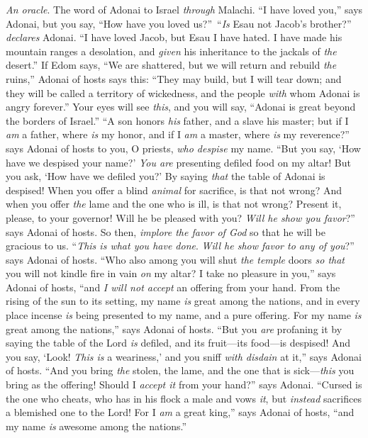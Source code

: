 
\begin{biblechapter} %
\verse \textit{An oracle}. The word of Adonai to Israel \textit{through} Malachi.
 “I have loved you,” says Adonai, but you say, “How have you loved us?” “\textit{Is} Esau not Jacob’s brother?” \textit{declares} Adonai. “I have loved Jacob,
\verse but Esau I have hated. I have made his mountain ranges a desolation, and \textit{given} his inheritance to the jackals of \textit{the} desert.”
\verse If Edom says, “We are shattered, but we will return and rebuild \textit{the} ruins,” Adonai of hosts says this: “They may build, but I will tear down; and they will be called a territory of wickedness, and the people \textit{with} whom Adonai is angry forever.”
\verse Your eyes will see \textit{this}, and you will say, “Adonai is great beyond the borders of Israel.”
 “A son honors \textit{his} father, and a slave his master; but if I \textit{am} a father, where \textit{is} my honor, and if I \textit{am} a master, where \textit{is} my reverence?” says Adonai of hosts to you, O priests, \textit{who despise} my name. “But you say, ‘How have we despised your name?’
\verse \textit{You are} presenting defiled food on my altar! But you ask, ‘How have we defiled you?’ By saying \textit{that} the table of Adonai is despised!
\verse When you offer a blind \textit{animal} for sacrifice, is that not wrong? And when you offer \textit{the} lame and the one who is ill, is that not wrong? Present it, please, to your governor! Will he be pleased with you? \textit{Will he show you favor}?” says Adonai of hosts.
\verse So then, \textit{implore the favor of God} so that he will be gracious to us. “\textit{This is what you have done}. \textit{Will he show favor to any of you}?” says Adonai of hosts.
\verse “Who also among you will shut \textit{the temple} doors \textit{so that} you will not kindle fire in vain \textit{on} my altar? I take no pleasure in you,” says Adonai of hosts, “and \textit{I will not accept} an offering from your hand.
\verse From the rising of the sun to its setting, my name \textit{is} great among the nations, and in every place incense \textit{is} being presented to my name, and a pure offering. For my name \textit{is} great among the nations,” says Adonai of hosts.
\verse “But you \textit{are} profaning it by saying the table of the Lord \textit{is} defiled, and its fruit—its food—is despised!
\verse And you say, ‘Look! \textit{This is} a weariness,’ and you sniff \textit{with disdain} at it,” says Adonai of hosts. “And you bring \textit{the} stolen, the lame, and the one that is sick—\textit{this} you bring as the offering! Should I \textit{accept it} from your hand?” says Adonai.
\verse “Cursed is the one who cheats, who has in his flock a male and vows \textit{it}, but \textit{instead} sacrifices a blemished one to the Lord! For I \textit{am} a great king,” says Adonai of hosts, “and my name \textit{is} awesome among the nations.”
\end{biblechapter}

